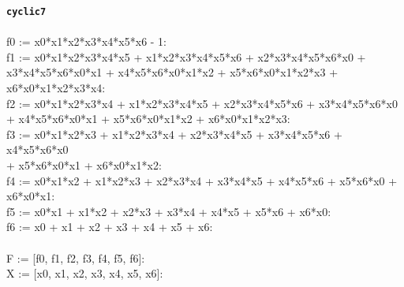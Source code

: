 \documentclass[letterpaper,12pt,titlepage,oneside,final]{book}
\newenvironment{codefont}{\footnotesize\ttfamily}{\par}
\begin{document}
\begin{appendices}
\noindent\textbf{\texttt{cyclic7}}\\\\
\noindent\begin{codefont}
 f0 := x0*x1*x2*x3*x4*x5*x6 - 1:
\\
f1 := x0*x1*x2*x3*x4*x5 + x1*x2*x3*x4*x5*x6 + x2*x3*x4*x5*x6*x0 + \\
x3*x4*x5*x6*x0*x1 + x4*x5*x6*x0*x1*x2 + x5*x6*x0*x1*x2*x3 + x6*x0*x1*x2*x3*x4:
\\
f2 := x0*x1*x2*x3*x4 + x1*x2*x3*x4*x5 + x2*x3*x4*x5*x6 + x3*x4*x5*x6*x0 \\
+ x4*x5*x6*x0*x1 + x5*x6*x0*x1*x2 + x6*x0*x1*x2*x3:
\\
f3 := x0*x1*x2*x3 + x1*x2*x3*x4 + x2*x3*x4*x5 + x3*x4*x5*x6 + x4*x5*x6*x0 \\
+ x5*x6*x0*x1 + x6*x0*x1*x2:
\\
f4 := x0*x1*x2 + x1*x2*x3 + x2*x3*x4 + x3*x4*x5 + x4*x5*x6 + x5*x6*x0 + x6*x0*x1:
\\
f5 := x0*x1 + x1*x2 + x2*x3 + x3*x4 + x4*x5 + x5*x6 + x6*x0:
\\
f6 := x0 + x1 + x2 + x3 + x4 + x5 + x6:
\\
\\
F := [f0, f1, f2, f3, f4, f5, f6]:
\\
X := [x0, x1, x2, x3, x4, x5, x6]:\\
\end{codefont}


\end{appendices}
\end{document}
